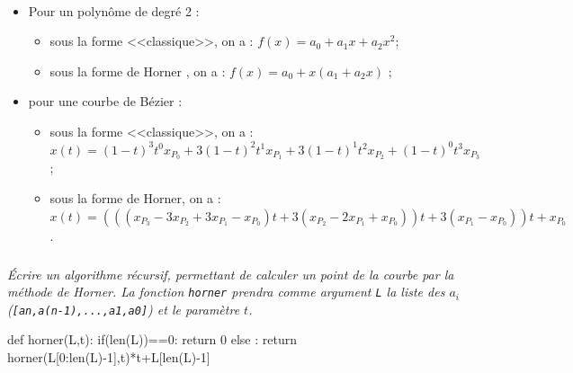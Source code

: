 \documentclass[10pt,fleqn]{article} %
\begin{document}
\begin{exemple}~\\

\begin{itemize}[label=,font=\color{ocre}] 
\item Pour un polynôme de degré 2 : 
\begin{itemize}
\item sous la forme <<classique>>, on a : $f(x)=a_0+a_1 x + a_2 x^2$;
\item sous la forme de Horner , on a : $f(x)=a_0+ x\left(a_1 + a_2 x\right)$ ;
\end{itemize}
\item pour une courbe de Bézier :
\begin{itemize}
\item sous la forme <<classique>>, on a : $x(t)=  \left(1-t \right)^3 t^0 x_{P_0} +3\left(1-t \right)^2 t^1 x_{P_1} +3\left(1-t \right)^1 t^2 x_{P_2} +\left(1-t \right)^0 t^3 x_{P_3}$;
\item sous la forme de Horner, on a : $x(t)=\left(\left(\left(x_{P_3}-3x_{P_2}+3x_{P_1}-x_{P_0}\right)t+3\left(x_{P_2}-2x_{P_1}+x_{P_0}\right)\right)t+3\left( x_{P_1}-x_{P_0}\right)\right)t+x_{P_0}$.
\end{itemize}
\end{itemize}

\end{exemple}

\fi



\subparagraph{}
\textit{Écrire un algorithme récursif, permettant de calculer un point de la courbe par la méthode de Horner. La fonction \texttt{horner} prendra comme argument \texttt{L} la liste des $a_i$ (\texttt{[an,a(n-1),...,a1,a0]}) et le paramètre $t$.}
\ifprof
\begin{corrige}
\begin{py}
\begin{python}
def horner(L,t):
    if(len(L))==0:
        return 0
    else : 
        return horner(L[0:len(L)-1],t)*t+L[len(L)-1]
\end{python}
\end{py}

\end{corrige}
\else
\fi
\end{document}
